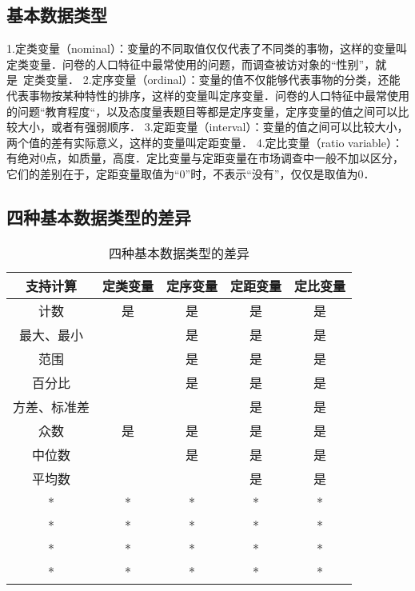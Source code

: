 \subsection{基本数据类型}
1.定类变量（nominal）：变量的不同取值仅仅代表了不同类的事物，这样的变量叫定类变量．问卷的人口特征中最常使用的问题，而调查被访对象的“性别”，就是 定类变量．
2.定序变量（ordinal）：变量的值不仅能够代表事物的分类，还能代表事物按某种特性的排序，这样的变量叫定序变量．问卷的人口特征中最常使用的问题“教育程度“，以及态度量表题目等都是定序变量，定序变量的值之间可以比较大小，或者有强弱顺序．
3.定距变量（interval）：变量的值之间可以比较大小，两个值的差有实际意义，这样的变量叫定距变量．
4.定比变量（ratio variable）：有绝对0点，如质量，高度．定比变量与定距变量在市场调查中一般不加以区分，它们的差别在于，定距变量取值为“0”时，不表示“没有”，仅仅是取值为0．
\subsection{四种基本数据类型的差异}
\begin{table}[ht]
\centering
\caption{四种基本数据类型的差异}\label{DatTyp_tab1}
\begin{tabular}{|c|c|c|c|c|}
\hline
支持计算 & 定类变量 & 定序变量 & 定距变量 & 定比变量 \\
\hline
计数 & 是 & 是 & 是 & 是 \\
\hline
最大、最小 &   & 是 & 是 & 是 \\
\hline
范围 &   & 是 & 是 & 是 \\
\hline
百分比 &   & 是 & 是 & 是 \\
\hline
方差、标准差 &   &   & 是 & 是 \\
\hline
众数 & 是 & 是 & 是 & 是 \\
\hline
中位数 &   & 是 & 是 & 是 \\
\hline
平均数 &   &   & 是 & 是 \\
\hline
* & * & * & * & * \\
\hline
* & * & * & * & * \\
\hline
* & * & * & * & * \\
\hline
* & * & * & * & * \\
\hline
\end{tabular}
\end{table}
